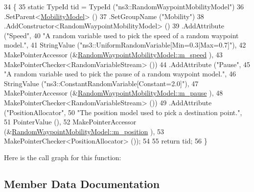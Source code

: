 \begin{DoxyCode}
34 \{
35   \textcolor{keyword}{static} TypeId tid = TypeId (\textcolor{stringliteral}{"ns3::RandomWaypointMobilityModel"})
36     .SetParent<\hyperlink{classns3_1_1MobilityModel_af61ca3dbc723d8109d115fb081fd0299}{MobilityModel}> ()
37     .SetGroupName (\textcolor{stringliteral}{"Mobility"})
38     .AddConstructor<RandomWaypointMobilityModel> ()
39     .AddAttribute (\textcolor{stringliteral}{"Speed"},
40                    \textcolor{stringliteral}{"A random variable used to pick the speed of a random waypoint model."},
41                    StringValue (\textcolor{stringliteral}{"ns3::UniformRandomVariable[Min=0.3|Max=0.7]"}),
42                    MakePointerAccessor (&\hyperlink{classns3_1_1RandomWaypointMobilityModel_a573f6a14ec00b07199fa6445f006f4ba}{RandomWaypointMobilityModel::m\_speed}
      ),
43                    MakePointerChecker<RandomVariableStream> ())
44     .AddAttribute (\textcolor{stringliteral}{"Pause"},
45                    \textcolor{stringliteral}{"A random variable used to pick the pause of a random waypoint model."},
46                    StringValue (\textcolor{stringliteral}{"ns3::ConstantRandomVariable[Constant=2.0]"}),
47                    MakePointerAccessor (&\hyperlink{classns3_1_1RandomWaypointMobilityModel_a96ecd2f32821fa7ce41897191a8aab8d}{RandomWaypointMobilityModel::m\_pause}
      ),
48                    MakePointerChecker<RandomVariableStream> ())
49     .AddAttribute (\textcolor{stringliteral}{"PositionAllocator"},
50                    \textcolor{stringliteral}{"The position model used to pick a destination point."},
51                    PointerValue (),
52                    MakePointerAccessor (&\hyperlink{classns3_1_1RandomWaypointMobilityModel_a5403d3195d0dd7afee4de130d9dc8a14}{RandomWaypointMobilityModel::m\_position}
      ),
53                    MakePointerChecker<PositionAllocator> ());
54 
55   \textcolor{keywordflow}{return} tid;
56 \}
\end{DoxyCode}


Here is the call graph for this function\+:




\subsection{Member Data Documentation}
